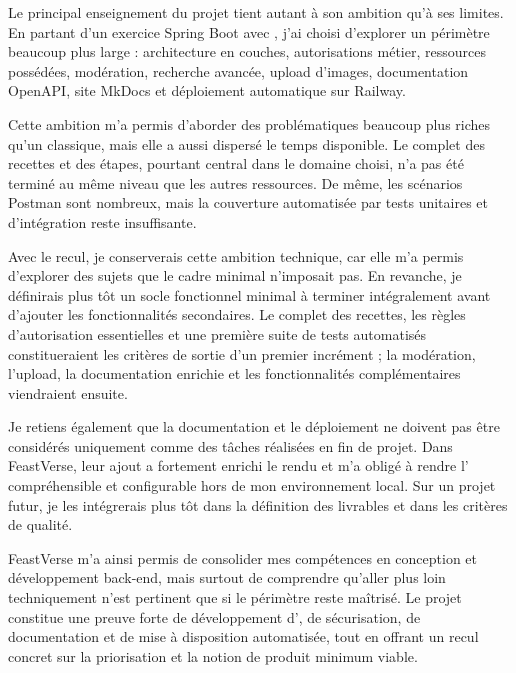 Le principal enseignement du projet tient autant à son ambition qu'à ses limites. En partant d'un exercice Spring Boot avec , j'ai choisi d'explorer un périmètre beaucoup plus large : architecture en couches, autorisations métier, ressources possédées, modération, recherche avancée, upload d'images, documentation OpenAPI, site MkDocs et déploiement automatique sur Railway.

Cette ambition m'a permis d'aborder des problématiques beaucoup plus riches qu'un  classique, mais elle a aussi dispersé le temps disponible. Le  complet des recettes et des étapes, pourtant central dans le domaine choisi, n'a pas été terminé au même niveau que les autres ressources. De même, les scénarios Postman sont nombreux, mais la couverture automatisée par tests unitaires et d'intégration reste insuffisante.

Avec le recul, je conserverais cette ambition technique, car elle m'a permis d'explorer des sujets que le cadre minimal n'imposait pas. En revanche, je définirais plus tôt un socle fonctionnel minimal à terminer intégralement avant d'ajouter les fonctionnalités secondaires. Le  complet des recettes, les règles d'autorisation essentielles et une première suite de tests automatisés constitueraient les critères de sortie d'un premier incrément ; la modération, l'upload, la documentation enrichie et les fonctionnalités complémentaires viendraient ensuite.

Je retiens également que la documentation et le déploiement ne doivent pas être considérés uniquement comme des tâches réalisées en fin de projet. Dans FeastVerse, leur ajout a fortement enrichi le rendu et m'a obligé à rendre l' compréhensible et configurable hors de mon environnement local. Sur un projet futur, je les intégrerais plus tôt dans la définition des livrables et dans les critères de qualité.

FeastVerse m'a ainsi permis de consolider mes compétences en conception et développement back-end, mais surtout de comprendre qu'aller plus loin techniquement n'est pertinent que si le périmètre reste maîtrisé. Le projet constitue une preuve forte de développement d', de sécurisation, de documentation et de mise à disposition automatisée, tout en offrant un recul concret sur la priorisation et la notion de produit minimum viable.